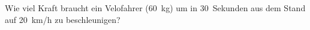 
\begin{aufgabe}
	Wie viel Kraft braucht ein Velofahrer (\SI{60}{kg}) um in \SI{30}{Sekunden} aus dem Stand auf \SI{20}{km/h} zu beschleunigen?	
\end{aufgabe}

